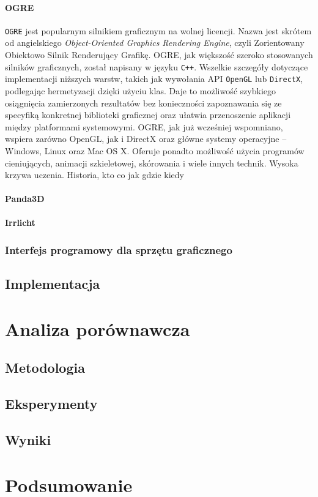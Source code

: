 \documentclass[11pt]{mwrep}
\begin{document}
      \subsubsection{OGRE}
  \texttt{OGRE} jest popularnym silnikiem graficznym na wolnej licencji. Nazwa jest skrótem od angielskiego \textit{Object-Oriented Graphics Rendering Engine}, czyli Zorientowany Obiektowo Silnik Renderujący Grafikę. OGRE, jak większość szeroko stosowanych silników graficznych, został napisany w języku \texttt{C++}. Wszelkie szczegóły dotyczące implementacji niższych warstw, takich jak wywołania API \texttt{OpenGL} lub \texttt{DirectX}, podlegając hermetyzacji dzięki użyciu klas. Daje to możliwość szybkiego osiągnięcia zamierzonych rezultatów bez konieczności zapoznawania się ze specyfiką konkretnej biblioteki graficznej oraz ułatwia przenoszenie aplikacji między platformami systemowymi. OGRE, jak już wcześniej wspomniano, wspiera zarówno OpenGL, jak i DirectX oraz główne systemy operacyjne -- Windows, Linux oraz Mac OS X. Oferuje ponadto możliwość użycia programów cieniujących, animacji szkieletowej, skórowania i wiele innych technik. Wysoka krzywa uczenia. Historia, kto co jak gdzie kiedy
      \subsubsection{Panda3D}
      \subsubsection{Irrlicht}
     \subsection{Interfejs programowy dla sprzętu graficznego}
  \section{Implementacja}

\chapter{Analiza porównawcza}
  \section{Metodologia}
  \section{Eksperymenty}
  \section{Wyniki}

\chapter{Podsumowanie}
\end{document}
